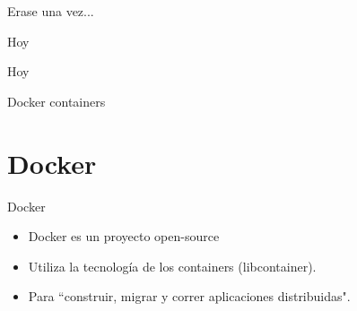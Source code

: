 \documentclass[compress]{beamer}
\begin{document}
\begin{frame}{Erase una vez...}
	\begin{figure}
		\centering
{}	\end{figure}
\end{frame}


\begin{frame}{Hoy}
	\begin{figure}
		\centering
{}	\end{figure}
\end{frame}


\begin{frame}{Hoy}
	\begin{figure}
		\centering
{}
	\end{figure}
\end{frame}

\begin{frame}{Docker containers}
	\begin{figure}
		\centering
{}
	\end{figure}
\end{frame}


%
%
\section{Docker}

\begin{frame}{Docker}
	\begin{itemize}
		\item Docker es un proyecto open-source
		\item Utiliza la tecnología de los containers (libcontainer).
		\item Para ``construir, migrar y correr aplicaciones distribuidas".
	\end{itemize}

\end{frame}
\end{document}
